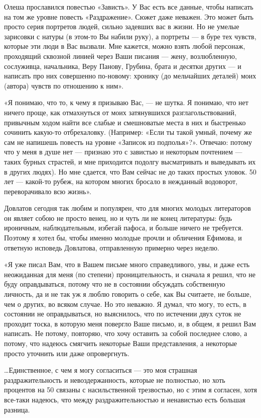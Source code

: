 Олеша прославился повестью «Зависть». У Вас есть все данные, чтобы написать на
том же уровне повесть «Раздражение». Сюжет даже неважен. Это может быть просто
серия портретов людей, сильно задевших вас в жизни. Но не умелые зарисовки с
натуры (в этом-то Вы набили руку), а портреты — в буре тех чувств, которые эти
люди в Вас вызвали. Мне кажется, можно взять любой персонаж, проходящий
сквозной линией через Ваши писания — жену, возлюбленную, сослуживца,
начальника, Веру Панову, Грубина, брата и десятки других — и написать про них
совершенно по-новому: хронику (до мельчайших деталей) моих (автора) чувств по
отношению к ним». 

«Я понимаю, что то, к чему я призываю Вас, — не шутка. Я понимаю, что нет
ничего проще, как отмахнуться от моих затянувшихся разглагольствований,
привычным ходом найти все слабые и смешноватые места в них и быстренько
сочинить какую-то отбрехаловку. (Например: «Если ты такой умный, почему же сам
не напишешь повесть на уровне «Записок из подполья»?». Отвечаю: потому что у
меня в душе нет — признаю это с завистью и некоторым почтением — таких бурных
страстей, и мне приходится подолгу высматривать и выведывать их в других
людях). Но мне сдается, что Вам сейчас не до таких простых уловок. 50 лет —
какой-то рубеж, на котором многих бросало в нежданный водоворот, переворачивало
всю жизнь». 

Довлатов сегодня так любим и популярен, что для многих молодых литераторов он
являет собою не просто венец, но и чуть ли не конец литературы: будь ироничным,
наблюдательным, избегай пафоса, и больше ничего не требуется. Поэтому я хотел
бы, чтобы именно молодые прочли и обличения Ефимова, и ответную исповедь
Довлатова, отправленную примерно через неделю.

«Я уже писал Вам, что в Вашем письме много справедливого, увы, и даже есть
неожиданная для меня (по степени) проницательность, и сначала я решил, что не
буду оправдываться, потому что не в состоянии обсуждать собственную личность,
да и не так уж я люблю говорить о себе, как Вы считаете, не больше, чем о
других, во всяком случае. Но это неважно. Я думал, что могу, то есть, в
состоянии не оправдываться, но выяснилось, что по истечении двух суток не
проходит тоска, в которую меня повергло Ваше письмо, и, в общем, я решил Вам
написать. Не потому, повторяю, что хочу оставить за собой последнее слово, а
потому, что надеюсь смягчить некоторые Ваши представления, а некоторые просто
уточнить или даже опровергнуть. 

…Единственное, с чем я могу согласиться — это моя страшная раздражительность и
невоздержанность, которые не полностью, но хоть процентов на 50 связаны с
насильственной трезвостью, но с этим я согласен, хотя все-таки надеюсь, что
между раздражительностью и ненавистью есть большая разница. 

